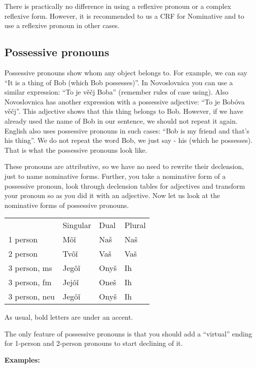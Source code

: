 There is practically no difference in using a reflexive pronoun or a complex reflexive form. However, it is recommended to us a CRF for Nominative and to use a reflexive pronoun in other cases.

\subsection{Possessive pronouns}

Possessive pronouns show whom any object belongs to. For example, we can say “It is a thing of Bob (which Bob possesses)”. In Novoslovnica you can use a similar expression: “To je věčj Boba” (remember rules of case using). Also Novoslovnica has another expression with a possessive adjective: “To je Bobóva věčj”. This adjective shows that this thing belongs to Bob. However, if we have already used the name of Bob in our sentence, we should not repeat it again. English also uses possessive pronouns in such cases: “Bob is my friend and that’s his thing”. We do not repeat the word Bob, we just say - his (which he possesses). That is what the possessive pronouns look like.

These pronouns are attributive, so we have no need to rewrite their declension, just to name nominative forms. Further, you take a nominative form of a possessive pronoun, look through declension tables for adjectives and transform your pronoun so as you did it with an adjective. Now let us look at the nominative forms of possessive pronouns.

\begin{table}
	\begin{tabular}{llll}
		& Singular & Dual & Plural \\
		1 person & Môǐ & Naš & Naš \\
		2 person & Tvôǐ & Vaš & Vaš \\
		3 person, ms & Jegôǐ & Onyš & Ih \\
		3 person, fm & Jejôǐ & Oneš & Ih \\
		3 person, neu & Jegôǐ & Onyš & Ih
	\end{tabular}
\end{table}

As usual, bold letters are under an accent.

The only feature of possessive pronouns is that you should add a “virtual” ending for 1-person and 2-person pronouns to start declining of it.

\textbf{Examples:}

